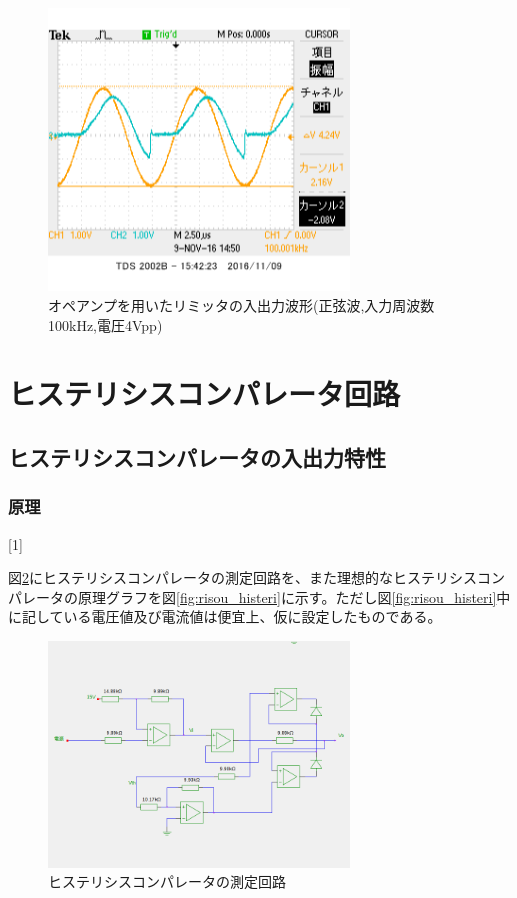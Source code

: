 \documentclass[11pt,a4j]{jsarticle}
\begin{document}
 \begin{figure}[htbp]
  \centering
  \includegraphics[width=8cm,clip]{1_1_ampFG_f100V4_ViVo.png}
  \caption{オペアンプを用いたリミッタの入出力波形(正弦波,入力周波数100kHz,電圧4Vpp)}
  \label{fig:ampFGf100v4}
 \end{figure}%
  
  
  \clearpage
    
 \section{ヒステリシスコンパレータ回路}
  \subsection{ヒステリシスコンパレータの入出力特性}
   \subsubsection{原理}[1]
    
    図\ref{fig:histeri_tokusei}にヒステリシスコンパレータの測定回路を、また理想的なヒステリシスコンパレータの原理グラフを図\ref{fig:risou_histeri}に示す。ただし図\ref{fig:risou_histeri}中に記している電圧値及び電流値は便宜上、仮に設定したものである。
    
    \begin{figure}[htbp]
  \centering
  \includegraphics[width=8cm,clip]{histeri_tokusei.png}
  \caption{ヒステリシスコンパレータの測定回路}
  \label{fig:histeri_tokusei}
 \end{figure}%
    
\end{document}
